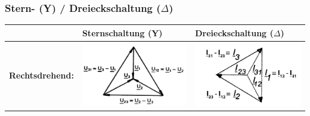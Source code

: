 		\subsubsection{Stern- (Y) / Dreieckschaltung ($\Delta$)}
            	\renewcommand{\arraystretch}{1.5}
			\begin{tabular}{| p{4.5cm} | l | l |}
				\hline
	 				& Sternschaltung (Y)		& Dreieckschaltung ($\Delta$)\\
	 			\hline
	 			\vspace{0.2cm}
	 				\textbf{Rechtsdrehend:} 
	 				&
	 					\parbox[c][3.5cm][c]{5cm}{\includegraphics[width=5cm]{bilder/Sternspannung.png}} &
	 					\parbox[c][3.5cm][c]{5cm}{\includegraphics[width=5cm]{bilder/Dreieckstrom.png}} \\
						

\end{tabular}
